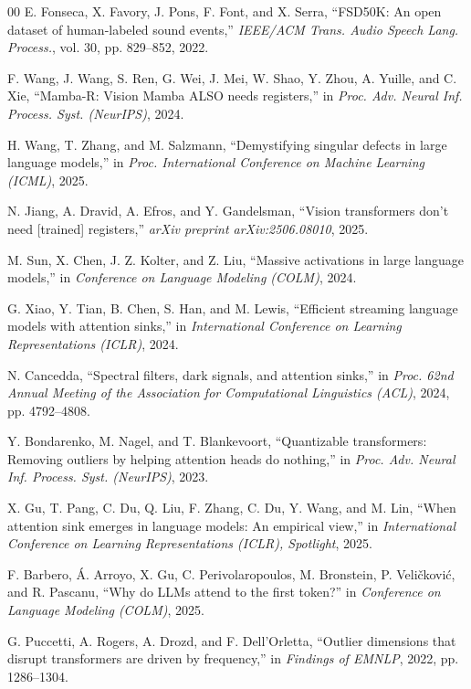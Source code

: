 \documentclass[conference]{IEEEtran}
\begin{document}
\begin{thebibliography}{00}
E. Fonseca, X. Favory, J. Pons, F. Font, and X. Serra, ``FSD50K: An open dataset of human-labeled sound events,'' \emph{IEEE/ACM Trans. Audio Speech Lang. Process.}, vol. 30, pp. 829--852, 2022.

F. Wang, J. Wang, S. Ren, G. Wei, J. Mei, W. Shao, Y. Zhou, A. Yuille, and C. Xie, ``Mamba-R: Vision Mamba ALSO needs registers,'' in \emph{Proc. Adv. Neural Inf. Process. Syst. (NeurIPS)}, 2024.

H. Wang, T. Zhang, and M. Salzmann, ``Demystifying singular defects in large language models,'' in \emph{Proc. International Conference on Machine Learning (ICML)}, 2025.

N. Jiang, A. Dravid, A. Efros, and Y. Gandelsman, ``Vision transformers don't need [trained] registers,'' \emph{arXiv preprint arXiv:2506.08010}, 2025.

M. Sun, X. Chen, J. Z. Kolter, and Z. Liu, ``Massive activations in large language models,'' in \emph{Conference on Language Modeling (COLM)}, 2024.

G. Xiao, Y. Tian, B. Chen, S. Han, and M. Lewis, ``Efficient streaming language models with attention sinks,'' in \emph{International Conference on Learning Representations (ICLR)}, 2024.

N. Cancedda, ``Spectral filters, dark signals, and attention sinks,'' in \emph{Proc. 62nd Annual Meeting of the Association for Computational Linguistics (ACL)}, 2024, pp. 4792--4808.

Y. Bondarenko, M. Nagel, and T. Blankevoort, ``Quantizable transformers: Removing outliers by helping attention heads do nothing,'' in \emph{Proc. Adv. Neural Inf. Process. Syst. (NeurIPS)}, 2023.

X. Gu, T. Pang, C. Du, Q. Liu, F. Zhang, C. Du, Y. Wang, and M. Lin, ``When attention sink emerges in language models: An empirical view,'' in \emph{International Conference on Learning Representations (ICLR), Spotlight}, 2025.

F. Barbero, \'A. Arroyo, X. Gu, C. Perivolaropoulos, M. Bronstein, P. Veli\v{c}kovi\'c, and R. Pascanu, ``Why do LLMs attend to the first token?'' in \emph{Conference on Language Modeling (COLM)}, 2025.

G. Puccetti, A. Rogers, A. Drozd, and F. Dell'Orletta, ``Outlier dimensions that disrupt transformers are driven by frequency,'' in \emph{Findings of EMNLP}, 2022, pp. 1286--1304.


\end{thebibliography}
\end{document}
